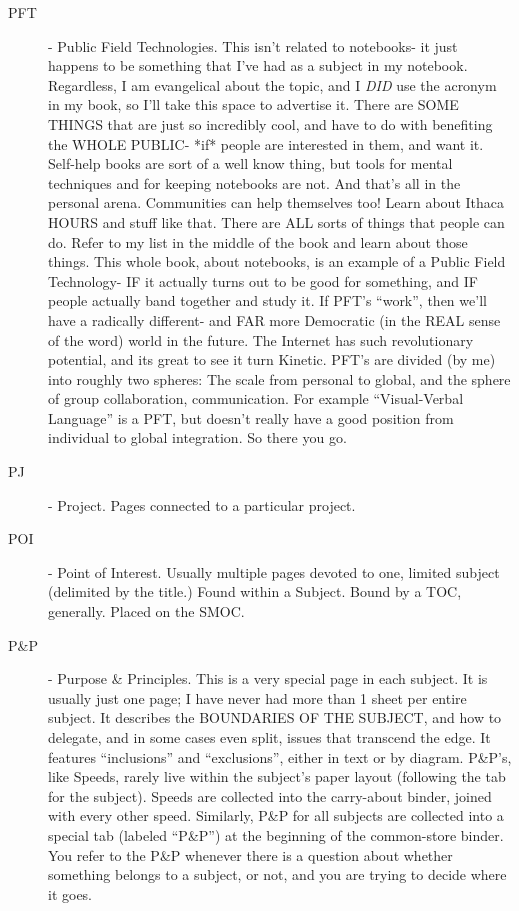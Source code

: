 \documentclass[oneside]{book}
\begin{document}
\begin{description}
\item[PFT] - Public Field Technologies. This isn't related to notebooks- it
just happens to be something that I've had as a subject in my
notebook. Regardless, I am evangelical about the topic, and I \emph{DID}
use the acronym in my book, so I'll take this space to advertise
it. There are SOME THINGS that are just so incredibly cool, and have
to do with benefiting the WHOLE PUBLIC- *if* people are interested in
them, and want it. Self-help books are sort of a well know thing, but
tools for mental techniques and for keeping notebooks are not. And
that's all in the personal arena. Communities can help themselves too!
Learn about Ithaca HOURS and stuff like that. There are ALL sorts of
things that people can do. Refer to my list in the middle of the book
and learn about those things. This whole book, about notebooks, is an
example of a Public Field Technology- IF it actually turns out to be
good for something, and IF people actually band together and study
it. If PFT's ``work'', then we'll have a radically different- and FAR
more Democratic (in the REAL sense of the word) world in the
future. The Internet has such revolutionary potential, and its great
to see it turn Kinetic. PFT's are divided (by me) into roughly two
spheres: The scale from personal to global, and the sphere of group
collaboration, communication. For example ``Visual-Verbal Language'' is
a PFT, but doesn't really have a good position from individual to
global integration. So there you go.

\item[PJ] - Project. Pages connected to a particular project.

\item[POI] - Point of Interest. Usually multiple pages devoted to one,
limited subject (delimited by the title.) Found within a
Subject. Bound by a TOC, generally. Placed on the SMOC.

\item[P\&P] - Purpose \& Principles. This is a very special page in each
subject. It is usually just one page; I have never had more than 1
sheet per entire subject. It describes the BOUNDARIES OF THE SUBJECT,
and how to delegate, and in some cases even split, issues that
transcend the edge. It features ``inclusions'' and ``exclusions'', either
in text or by diagram. P\&P's, like Speeds, rarely live within the
subject's paper layout (following the tab for the subject). Speeds are
collected into the carry-about binder, joined with every other
speed. Similarly, P\&P for all subjects are collected into a special
tab (labeled ``P\&P'') at the beginning of the common-store binder. You
refer to the P\&P whenever there is a question about whether something
belongs to a subject, or not, and you are trying to decide where it
goes.


\end{description}
\end{document}
